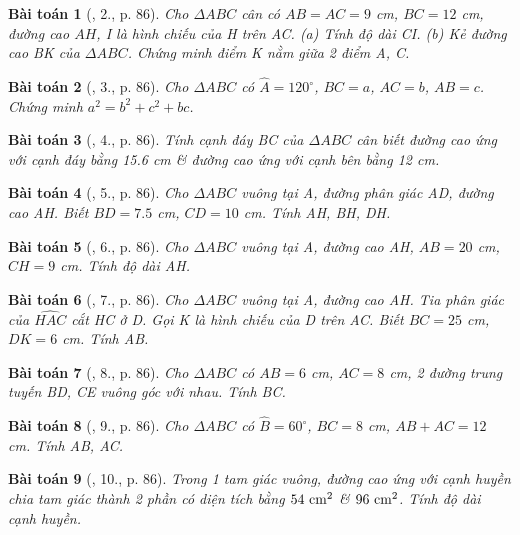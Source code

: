 \documentclass{article}
\newtheorem{baitoan}{Bài toán}
\begin{document}
\begin{baitoan}[\cite{Binh_Toan_9_tap_1}, 2., p. 86]
	Cho $\Delta ABC$ cân có $AB = AC = 9$ {\rm cm}, $BC = 12$ {\rm cm}, đường cao $AH$, I là hình chiếu của H trên AC. (a) Tính độ dài CI. (b) Kẻ đường cao BK của $\Delta ABC$. Chứng minh điểm K nằm giữa 2 điểm A, C.
\end{baitoan}

\begin{baitoan}[\cite{Binh_Toan_9_tap_1}, 3., p. 86]
	Cho $\Delta ABC$ có $\widehat{A} = 120^\circ$, $BC = a$, $AC = b$, $AB = c$. Chứng minh $a^2 = b^2 + c^2 + bc$.
\end{baitoan}

\begin{baitoan}[\cite{Binh_Toan_9_tap_1}, 4., p. 86]
	Tính cạnh đáy BC của $\Delta ABC$ cân biết đường cao ứng với cạnh đáy bằng {\rm15.6 cm} \& đường cao ứng với cạnh bên bằng {\rm12 cm}.
\end{baitoan}

\begin{baitoan}[\cite{Binh_Toan_9_tap_1}, 5., p. 86]
	Cho $\Delta ABC$ vuông tại A, đường phân giác AD, đường cao AH. Biết $BD = 7.5$ {\rm cm}, $CD = 10$ {\rm cm}. Tính AH, BH, DH.
\end{baitoan}

\begin{baitoan}[\cite{Binh_Toan_9_tap_1}, 6., p. 86]
	Cho $\Delta ABC$ vuông tại A, đường cao AH, $AB = 20$ {\rm cm}, $CH = 9$ {\rm cm}. Tính độ dài AH.
\end{baitoan}

\begin{baitoan}[\cite{Binh_Toan_9_tap_1}, 7., p. 86]
	Cho $\Delta ABC$ vuông tại A, đường cao AH. Tia phân giác của $\widehat{HAC}$ cắt HC ở D. Gọi K là hình chiếu của D trên AC. Biết $BC = 25$ {\rm cm}, $DK = 6$ {\rm cm}. Tính AB.
\end{baitoan}

\begin{baitoan}[\cite{Binh_Toan_9_tap_1}, 8., p. 86]
	Cho $\Delta ABC$ có $AB = 6$ {\rm cm}, $AC = 8$ {\rm cm}, 2 đường trung tuyến BD, CE vuông góc với nhau. Tính BC.
\end{baitoan}

\begin{baitoan}[\cite{Binh_Toan_9_tap_1}, 9., p. 86]
	Cho $\Delta ABC$ có $\widehat{B} = 60^\circ$, $BC = 8$ {\rm cm}, $AB + AC = 12$ {\rm cm}. Tính AB, AC.
\end{baitoan}

\begin{baitoan}[\cite{Binh_Toan_9_tap_1}, 10., p. 86]
	Trong 1 tam giác vuông, đường cao ứng với cạnh huyền chia tam giác thành 2 phần có diện tích bằng $\rm54\ cm^2$ \& $\rm96\ cm^2$. Tính độ dài cạnh huyền.
\end{baitoan}
\end{document}
